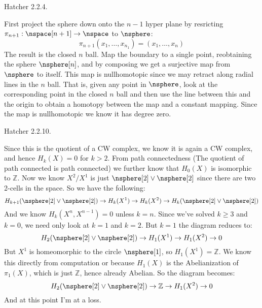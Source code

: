     \begin{problem}
        Hatcher 2.2.4.
    \end{problem}
    \begin{solution}
        First project the sphere down onto the $n-1$ hyper plane by
        resricting $\pi_{n+1}:\nspace[n+1]\rightarrow\nspace$ to $\nsphere$:
        \begin{equation}
            \pi_{n+1}(x_{1},\dots,x_{n_1})=(x_{1},\dots,x_{n})
        \end{equation}
        The result is the closed $n$ ball. Map the boundary to a single point,
        reobtaining the sphere $\nsphere[n]$, and by composing we get a
        surjective map from $\nsphere$ to itself. This map is nullhomotopic
        since we may retract along radial lines in the $n$ ball. That is, given
        any point in $\nsphere$, look at the corresponding point in the closed
        $n$ ball and then use the line between this and the origin to obtain a
        homotopy between the map and a constant mapping. Since the map is
        nullhomotopic we know it has degree zero.
    \end{solution}
    \begin{problem}
        Hatcher 2.2.10.
    \end{problem}
    \begin{solution}
        Since this is the quotient of a CW complex, we know it is again a CW
        complex, and hence $H_{k}(X)=0$ for $k>2$. From path connectedness
        (The quotient of path connected is path connected) we further know that
        $H_{0}(X)$ is isomorphic to $\mathbb{Z}$. Now we know $X^{2}/X^{1}$ is
        just $\nsphere[2]\lor\nsphere[2]$ since there are two 2-cells in the
        space. So we have the following:
        \begin{equation}
            H_{k+1}(\nsphere[2]\lor\nsphere[2])\rightarrow
            H_{k}(X^{1})\rightarrow{H}_{k}(X^{2})
            \rightarrow{H}_{k}(\nsphere[2]\lor\nsphere[2])
        \end{equation}
        And we know $H_{k}(X^{n},X^{n-1})=0$ unless $k=n$. Since we've solved
        $k\geq{3}$ and $k=0$, we need only look at $k=1$ and $k=2$. But $k=1$
        the diagram reduces to:
        \begin{equation}
            H_{2}(\nsphere[2]\lor\nsphere[2])\rightarrow
            H_{1}(X^{1})\rightarrow
            H_{1}(X^{2})\rightarrow{0}
        \end{equation}
        But $X^{1}$ is homeomorphic to the circle $\nsphere[1]$, so
        $H_{1}(X^{1})=\mathbb{Z}$. We know this directly from computation or
        because $H_{1}(X)$ is the Abelianization of $\pi_{1}(X)$, which is just
        $\mathbb{Z}$, hence already Abelian. So the diagram becomes:
        \begin{equation}
            H_{2}(\nsphere[2]\lor\nsphere[2])\rightarrow
            \mathbb{Z}\rightarrow
            H_{1}(X^{2})\rightarrow{0}
        \end{equation}
        And at this point I'm at a loss.
    \end{solution}
